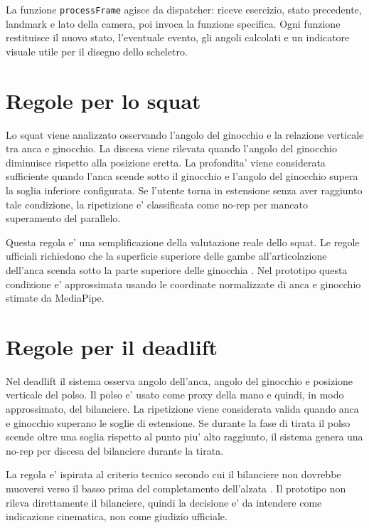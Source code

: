 La funzione \texttt{processFrame} agisce da dispatcher: riceve esercizio, stato precedente, landmark e lato della camera, poi invoca la funzione specifica. Ogni funzione restituisce il nuovo stato, l'eventuale evento, gli angoli calcolati e un indicatore visuale utile per il disegno dello scheletro.

\section{Regole per lo squat}

Lo squat viene analizzato osservando l'angolo del ginocchio e la relazione verticale tra anca e ginocchio. La discesa viene rilevata quando l'angolo del ginocchio diminuisce rispetto alla posizione eretta. La profondita' viene considerata sufficiente quando l'anca scende sotto il ginocchio e l'angolo del ginocchio supera la soglia inferiore configurata. Se l'utente torna in estensione senza aver raggiunto tale condizione, la ripetizione e' classificata come no-rep per mancato superamento del parallelo.

Questa regola e' una semplificazione della valutazione reale dello squat. Le regole ufficiali richiedono che la superficie superiore delle gambe all'articolazione dell'anca scenda sotto la parte superiore delle ginocchia \cite{ipfRules2024}. Nel prototipo questa condizione e' approssimata usando le coordinate normalizzate di anca e ginocchio stimate da MediaPipe.

\section{Regole per il deadlift}

Nel deadlift il sistema osserva angolo dell'anca, angolo del ginocchio e posizione verticale del polso. Il polso e' usato come proxy della mano e quindi, in modo approssimato, del bilanciere. La ripetizione viene considerata valida quando anca e ginocchio superano le soglie di estensione. Se durante la fase di tirata il polso scende oltre una soglia rispetto al punto piu' alto raggiunto, il sistema genera una no-rep per discesa del bilanciere durante la tirata.

La regola e' ispirata al criterio tecnico secondo cui il bilanciere non dovrebbe muoversi verso il basso prima del completamento dell'alzata \cite{ipfRules2024}. Il prototipo non rileva direttamente il bilanciere, quindi la decisione e' da intendere come indicazione cinematica, non come giudizio ufficiale.


